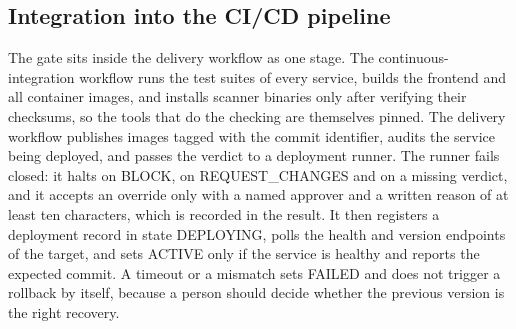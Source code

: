 \documentclass[12pt,onecolumn,draftclsnofoot]{IEEEtran}
\begin{document}
\subsection{Integration into the CI/CD pipeline}
The gate sits inside the delivery workflow as one stage. The continuous-integration workflow runs the test suites of every service, builds the frontend and all container images, and installs scanner binaries only after verifying their checksums, so the tools that do the checking are themselves pinned. The delivery workflow publishes images tagged with the commit identifier, audits the service being deployed, and passes the verdict to a deployment runner. The runner fails closed: it halts on BLOCK, on REQUEST\_CHANGES and on a missing verdict, and it accepts an override only with a named approver and a written reason of at least ten characters, which is recorded in the result. It then registers a deployment record in state DEPLOYING, polls the health and version endpoints of the target, and sets ACTIVE only if the service is healthy and reports the expected commit. A timeout or a mismatch sets FAILED and does not trigger a rollback by itself, because a person should decide whether the previous version is the right recovery.
\end{document}
